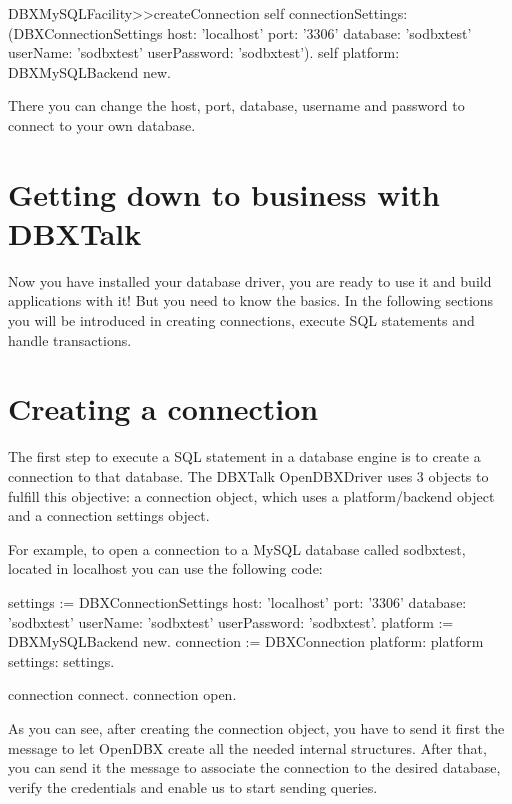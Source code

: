 \documentclass[a4paper,10pt,twoside]{book}
\begin{document}
\begin{code}{}
DBXMySQLFacility>>createConnection
    self connectionSettings: (DBXConnectionSettings
			    host: 'localhost'
			    port: '3306'
			    database: 'sodbxtest'
			    userName: 'sodbxtest'
			    userPassword: 'sodbxtest').
    self platform: DBXMySQLBackend new.
\end{code}

There you can change the host, port, database, username and password to connect to your own database.


\section{Getting down to business with DBXTalk}
Now you have installed your database driver, you are ready to use it and build applications with it!  But you need to know the basics.  In the following sections you will be introduced in creating connections, execute SQL statements and handle transactions.

\section{Creating a connection}
The first step to execute a SQL statement in a database engine is to create a connection to that database.  The DBXTalk OpenDBXDriver uses 3 objects to fulfill this objective: a connection object, which uses a platform/backend object and a connection settings object.

For example, to open a connection to a MySQL database called sodbxtest, located in localhost you can use the following code:

\begin{code}{}
settings := DBXConnectionSettings
                     host: 'localhost'
                     port: '3306'
                     database: 'sodbxtest'
                     userName: 'sodbxtest'
                     userPassword: 'sodbxtest'.
platform := DBXMySQLBackend new.
connection := DBXConnection platform: platform settings: settings.

connection connect.
connection open.
\end{code}

As you can see, after creating the connection object, you have to send it first the  message to let OpenDBX create all the needed internal structures.  After that, you can send it the  message to associate the connection to the desired database, verify the credentials and enable us to start sending queries.
\end{document}
